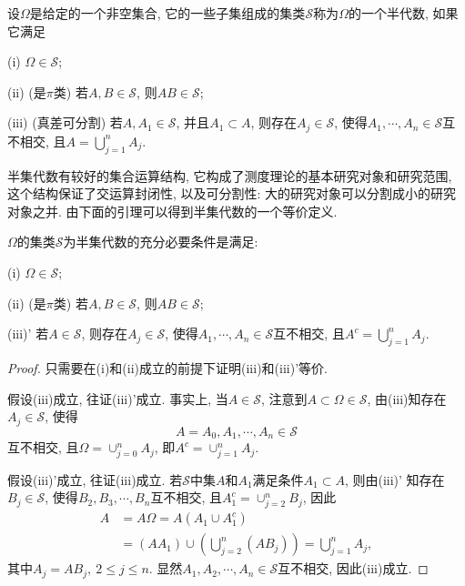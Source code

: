 \begin{definition}[半(集)代数]
	设$\Omega$是给定的一个非空集合, 它的一些子集组成的集类$\mathscr{S}$称为$\Omega$的一个半代数, 如果它满足
	\begin{blist}
		\item[(i)] $\Omega\in\mathscr{S}$;
		\item[(ii)] (是$\pi$类) 若$A,B\in\mathscr{S}$, 则$AB\in\mathscr{S}$;
		\item[(iii)] (真差可分割) 若$A,A_1\in\mathscr{S}$, 并且$A_1\subset A$, 则存在$A_j\in\mathscr{S}$, 使得$A_1,\cdots,A_n\in\mathscr{S}$互不相交, 且$A = \bigcup_{j=1}^nA_j$.
	\end{blist}
\end{definition}
半集代数有较好的集合运算结构, 它构成了测度理论的基本研究对象和研究范围, 这个结构保证了交运算封闭性, 以及可分割性: 大的研究对象可以分割成小的研究对象之并. 由下面的引理可以得到半集代数的一个等价定义.

\begin{lemma}
	$\Omega$的集类$\mathscr{S}$为半集代数的充分必要条件是满足:
	\begin{blist}
		\item[(i)] $\Omega\in\mathscr{S}$;
		\item[(ii)] (是$\pi$类) 若$A,B\in\mathscr{S}$, 则$AB\in\mathscr{S}$;
		\item[(iii)'] 若$A\in\mathscr{S}$,  则存在$A_j\in\mathscr{S}$, 使得$A_1,\cdots,A_n\in\mathscr{S}$互不相交, 且$A^c = \bigcup_{j=1}^nA_j$.
	\end{blist}
\end{lemma}
\begin{proof}
	只需要在(i)和(ii)成立的前提下证明(iii)和(iii)'等价.
	
	假设(iii)成立, 往证(iii)'成立. 事实上, 当$A\in\mathscr{S}$, 注意到$A\subset\Omega\in\mathscr{S}$, 由(iii)知存在$A_j\in\mathscr{S}$, 使得
	\begin{equation}
	A = A_0,A_1,\cdots,A_n\in\mathscr{S}
	\end{equation}
	互不相交, 且$\Omega = \cup_{j=0}^nA_j$, 即$A^c=\cup_{j=1}^nA_j$.
	
	假设(iii)'成立, 往证(iii)成立. 若$\mathscr{S}$中集$A$和$A_1$满足条件$A_1\subset A$, 则由(iii)' 知存在$B_j\in\mathscr{S}$, 使得$B_2,B_3,\cdots,B_n$互不相交, 且$A_1^c = \cup_{j=2}^nB_j$, 因此
	\begin{align}
	A&= A\Omega = A(A_1\cup A_1^c)\nonumber\\
	&= (AA_1)\cup\left( \bigcup_{j=2}^n(AB_j) \right) = \bigcup_{j=1}^nA_j,
	\end{align}
	其中$A_j = AB_j,~2\leqslant j\leqslant n$. 显然$A_1,A_2,\cdots,A_n\in\mathscr{S}$互不相交, 因此(iii)成立.
\end{proof}

